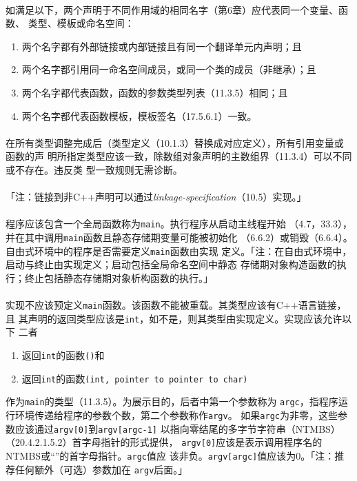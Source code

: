 \paragraph{}
如满足以下，两个声明于不同作用域的相同名字（第6章）应代表同一个变量、函数、
类型、模板或命名空间：
\begin{enumerate}
  \item{两个名字都有外部链接或内部链接且有同一个翻译单元内声明；且}
  \item{两个名字都引用同一命名空间成员，或同一个类的成员（非继承）；且}
  \item{两个名字都代表函数，函数的参数类型列表（11.3.5）相同；且}
  \item{两个名字都代表函数模板，模板签名（17.5.6.1）一致。}
\end{enumerate}

\paragraph{}
在所有类型调整完成后（类型定义（10.1.3）替换成对应定义），所有引用变量或函数的声
明所指定类型应该一致，除数组对象声明的主数组界（11.3.4）可以不同或不存在。违反类
型一致规则无需诊断。

\paragraph{}
「注：链接到非C++声明可以通过\textit{linkage-specification}（10.5）实现。」

\paragraph{}
程序应该包含一个全局函数称为\texttt{main}。执行程序从启动主线程开始
（4.7，33.3），并在其中调用\texttt{main}函数且静态存储期变量可能被初始化
（6.6.2）或销毁（6.6.4）。自由式环境中的程序是否需要定义\texttt{main}函数由实现
定义。「注：在自由式环境中，启动与终止由实现定义；启动包括全局命名空间中静态
存储期对象构造函数的执行；终止包括静态存储期对象析构函数的执行。」

\paragraph{}
实现不应该预定义\texttt{main}函数。该函数不能被重载。其类型应该有C++语言链接，且
其声明的返回类型应该是\texttt{int}，如不是，则其类型由实现定义。实现应该允许以下
二者
\begin{enumerate}
  \item{返回\texttt{int}的函数\texttt{()}和}
  \item{返回\texttt{int}的函数\texttt{(int, pointer to pointer to char)}}
\end{enumerate}
作为\texttt{main}的类型（11.3.5）。为展示目的，后者中第一个参数称为
\texttt{argc}，指程序运行环境传递给程序的参数个数，第二个参数称作\texttt{argv}。
如果\texttt{argc}为非零，这些参数应该通过\texttt{argv[0]}到\texttt{argv[argc-1]}
以指向零结尾的多字节字符串（NTMBS）（20.4.2.1.5.2）首字母指针的形式提供，
\texttt{argv[0]}应该是表示调用程序名的NTMBS或``''的首字母指针。\texttt{argc}值应
该非负。\texttt{argv[argc]}值应该为$0$。「注：推荐任何额外（可选）参数加在
\texttt{argv}后面。」

